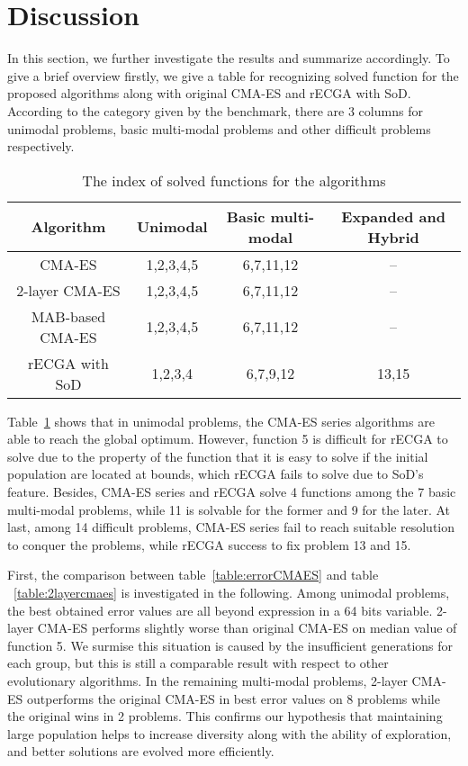 \section{Discussion}
  \label{sec:discussion}

In this section, we further investigate the results and summarize
accordingly.
To give a brief overview firstly, we give a table for recognizing solved
function for the proposed algorithms along with original CMA-ES and
rECGA with SoD.
According to the category given by the benchmark, there are 3 columns
for unimodal problems, basic multi-modal problems and other difficult
problems respectively.

\begin{table}
\centering  
\begin{tabular}{cccc}
Algorithm & Unimodal & Basic multi-modal & Expanded and Hybrid \\\hline  
CMA-ES   & 1,2,3,4,5 & 6,7,11,12 & -- \\
2-layer CMA-ES & 1,2,3,4,5 & 6,7,11,12 & -- \\
MAB-based CMA-ES & 1,2,3,4,5 & 6,7,11,12 & -- \\
rECGA with SoD & 1,2,3,4 & 6,7,9,12 &13,15 \\\hline
\end{tabular}
  \caption{The index of solved functions for the algorithms}
  \label{table:solved}

\end{table}

Table~\ref{table:solved} shows that in unimodal problems, the CMA-ES series algorithms
are able to reach the global optimum.
However, function 5 is difficult for rECGA to solve due to the property of
the function that it is easy to solve if the initial population are
located at bounds, which rECGA fails to solve due to SoD's feature.
Besides, CMA-ES series and rECGA solve 4 functions among the 7 basic
multi-modal problems, while 11 is solvable for the former and 9 for the
later.
At last, among 14 difficult problems, CMA-ES series fail to reach
suitable resolution to conquer the problems, while rECGA success to fix problem
13 and 15.

First, the comparison between table~\ref{table:errorCMAES} and table
~\ref{table:2layercmaes} is investigated in the following.
Among unimodal problems, the best obtained error values are all beyond
expression in a 64 bits variable. 2-layer CMA-ES performs slightly worse
than original CMA-ES on median value of function 5.
We surmise this situation is caused by the insufficient generations for
each group, but this is still a comparable result with respect to other
evolutionary algorithms.
In the remaining multi-modal problems, 2-layer CMA-ES outperforms the original
CMA-ES in best error values on 8 problems while the original
wins in 2 problems.
This confirms our hypothesis that maintaining large population helps to
increase diversity along with the ability of exploration, and better
solutions are evolved more efficiently.


